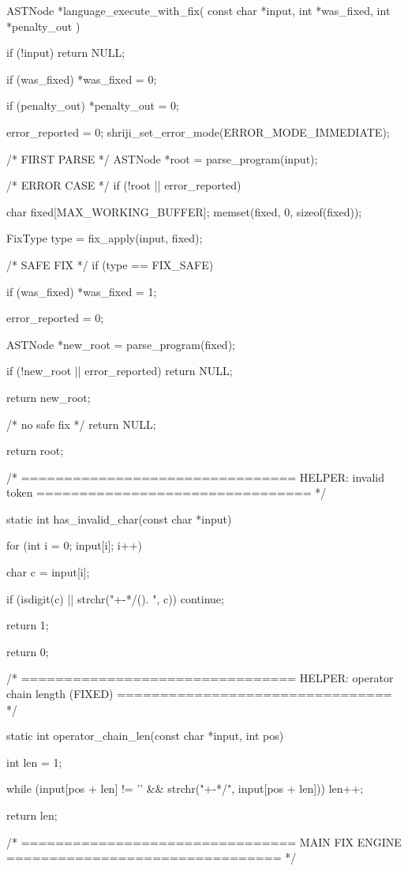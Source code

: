 \documentclass{article}
\begin{document}
ASTNode *language_execute_with_fix(
    const char *input,
    int *was_fixed,
    int *penalty_out
)
{
    if (!input)
        return NULL;

    if (was_fixed)
        *was_fixed = 0;

    if (penalty_out)
        *penalty_out = 0;

    error_reported = 0;
    shriji_set_error_mode(ERROR_MODE_IMMEDIATE);

    /* FIRST PARSE */
    ASTNode *root = parse_program(input);

    /* ERROR CASE */
    if (!root || error_reported)
    {
        char fixed[MAX_WORKING_BUFFER];
        memset(fixed, 0, sizeof(fixed));

        FixType type = fix_apply(input, fixed);

        /* SAFE FIX */
        if (type == FIX_SAFE)
        {
            if (was_fixed)
                *was_fixed = 1;

            error_reported = 0;

            ASTNode *new_root = parse_program(fixed);

            if (!new_root || error_reported)
                return NULL;

            return new_root;
        }

        /* no safe fix */
        return NULL;
    }

    return root;
}


/* ================================
   HELPER: invalid token
================================ */

static int has_invalid_char(const char *input)
{
    for (int i = 0; input[i]; i++)
    {
        char c = input[i];

        if (isdigit(c) || strchr("+-*/(). ", c))
            continue;

        return 1;
    }
    return 0;
}


/* ================================
   HELPER: operator chain length (FIXED)
================================ */

static int operator_chain_len(const char *input, int pos)
{
    int len = 1;

    while (input[pos + len] != '\0' &&
           strchr("+-*/", input[pos + len]))
    {
        len++;
    }

    return len;
}


/* ================================
   MAIN FIX ENGINE
================================ */
\end{document}
